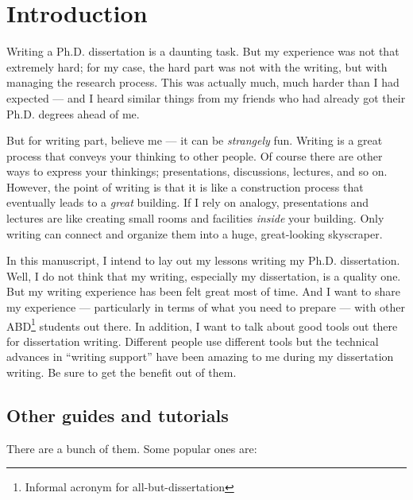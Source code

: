 \documentclass[11pt]{article}
\begin{document}
\section{Introduction}

Writing a Ph.D. dissertation is a daunting task. But my experience was not
that extremely hard; for my case, the hard part was not with the writing, but
with managing the research process. This was actually much, much harder than I
had expected --- and I heard similar things from my friends who had already
got their Ph.D. degrees ahead of me.

But for writing part, believe me --- it can be \emph{strangely} fun.  Writing
is a great process that conveys your thinking to other people.  Of course
there are other ways to express your thinkings; presentations, discussions,
lectures, and so on.  However, the point of writing is that it is like a
construction process that eventually leads to a \emph{great} building.  If I
rely on analogy, presentations and lectures are like creating small rooms and
facilities \emph{inside} your building. Only writing can connect and organize
them into a huge, great-looking skyscraper.

In this manuscript, I intend to lay out my lessons writing my Ph.D.
dissertation. Well, I do not think that my writing, especially my
dissertation, is a quality one. But my writing experience has been felt great
most of time. And I want to share my experience --- particularly in terms of
what you need to prepare --- with other ABD\footnote{Informal acronym for
all-but-dissertation} students out there. In addition, I want to talk about good
tools out there for dissertation writing.  Different people use different
tools but the technical advances in ``writing support'' have been amazing to
me during my dissertation writing.  Be sure to get the benefit out of them.

\subsection{Other guides and tutorials}
There are a bunch of them. Some popular ones are:
\end{document}

